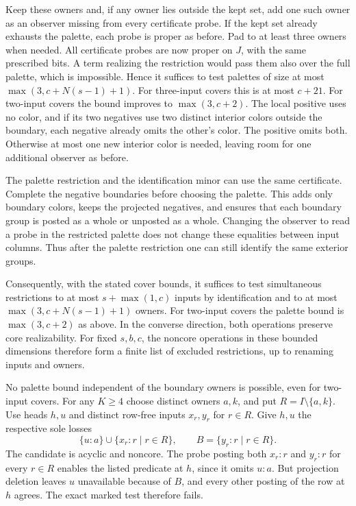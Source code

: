 Keep these owners and, if any owner
lies outside the kept set, add one
such owner as an observer missing
from every certificate probe. If the
kept set already exhausts the palette,
each probe is proper as before.
Pad to at least three owners when
needed. All certificate probes are
now proper on $J$, with the same
prescribed bits. A term realizing
the restriction would pass them
also over the full palette, which
is impossible. Hence it suffices to
test palettes of size at most
$\max(3,c+N(s-1)+1)$. For three-input
covers this is at most $c+21$.
For two-input covers the bound improves to
$\max(3,c+2)$. The local positive uses no color,
and if its two negatives use two distinct
interior colors outside the boundary, each
negative already omits the other's color.
The positive omits both. Otherwise at most
one new interior color is needed, leaving
room for one additional observer as before.

The palette restriction and the identification
minor can use the same certificate. Complete
the negative boundaries before choosing the
palette. This adds only boundary colors,
keeps the projected negatives, and ensures
that each boundary group is posted as a
whole or unposted as a whole. Changing the
observer to read a probe in the restricted
palette does not change these equalities
between input columns. Thus after the
palette restriction one can still identify
the same exterior groups.

Consequently, with the stated cover bounds,
it suffices to test simultaneous restrictions
to at most $s+\max(1,c)$ inputs by identification
and to at most $\max(3,c+N(s-1)+1)$ owners.
For two-input covers the palette bound is
$\max(3,c+2)$ as above. In the converse
direction, both operations preserve core
realizability. For fixed $s,b,c$, the
noncore operations in these bounded
dimensions therefore form a finite list
of excluded restrictions, up to renaming
inputs and owners.

No palette bound independent of the boundary
owners is possible, even for two-input
covers. For any $K\ge4$ choose distinct
owners $a,k$, and put $R=I\setminus\{a,k\}$.
Use heads $h,u$ and distinct row-free
inputs $x_r,y_r$ for $r\in R$. Give $h,u$
the respective sole losses
\[
 \{u:a\}\cup\{x_r:r\mid r\in R\},
 \qquad B=\{y_r:r\mid r\in R\}.
\]
The candidate is acyclic and noncore.
The probe posting both $x_r:r$ and $y_r:r$
for every $r\in R$ enables the listed
predicate at $h$, since it omits $u:a$.
But projection deletion leaves $u$
unavailable because of $B$, and every
other posting of the row at $h$ agrees.
The exact marked test therefore fails.

